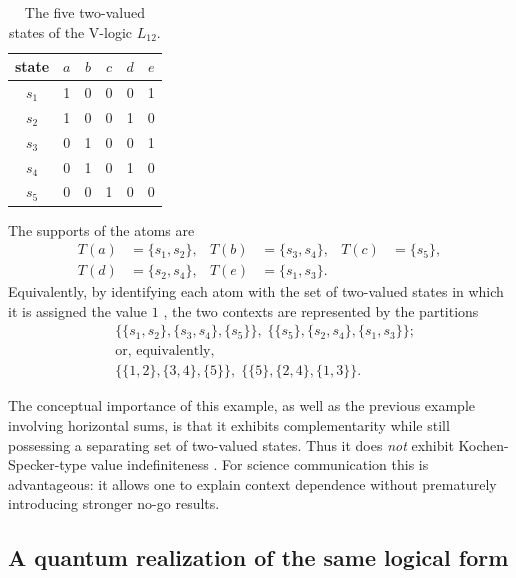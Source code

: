 \documentclass[
  10pt,
  twocolumn,
  aps,
  pra,
  showkeys,
  amsmath,amssymb,
  longbibliography
]{revtex4-2}
\begin{document}
\begin{table}[b]
\caption{The five two-valued states of the V-logic \(L_{12}\).}
\label{tab:vstates}
\begin{ruledtabular}
\begin{tabular}{c c c c c c}
state & \(a\) & \(b\) & \(c\) & \(d\) & \(e\) \\
\hline
\(s_1\) & 1 & 0 & 0 & 0 & 1 \\
\(s_2\) & 1 & 0 & 0 & 1 & 0 \\
\(s_3\) & 0 & 1 & 0 & 0 & 1 \\
\(s_4\) & 0 & 1 & 0 & 1 & 0 \\
\(s_5\) & 0 & 0 & 1 & 0 & 0 \\
\end{tabular}
\end{ruledtabular}
\end{table}

The supports of the atoms are
\begin{align}
T(a)&=\{s_1,s_2\}, & T(b)&=\{s_3,s_4\}, & T(c)&=\{s_5\},
\nonumber\\
T(d)&=\{s_2,s_4\}, & T(e)&=\{s_1,s_3\}.
\label{eq:vlogic_supports}
\end{align}
Equivalently, by identifying each atom with the set of two-valued states in which it is assigned the value \(1\) \cite{svozil-2001-eua}, the two contexts are represented by the partitions
\begin{equation}
\begin{split}
&\{\{s_1,s_2\},\{s_3,s_4\},\{s_5\}\},
\;
\{\{s_5\},\{s_2,s_4\},\{s_1,s_3\}\};
\\
&\text{or, equivalently,}
\\
&\{\{1,2\},\{3,4\},\{5\}\},
\;
\{\{5\},\{2,4\},\{1,3\}\}.
\end{split}
\end{equation}

The conceptual importance of this example, as well as the previous example involving horizontal sums, is that it exhibits complementarity while still possessing a separating set of two-valued states. Thus it does \emph{not} exhibit Kochen-Specker-type value indefiniteness \cite{kochen1}. For science communication this is advantageous: it allows one to explain context dependence without prematurely introducing stronger no-go results.

\subsection{A quantum realization of the same logical form}
\end{document}
